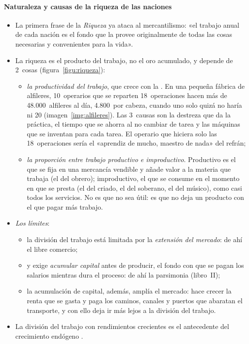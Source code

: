 \documentclass[11pt]{article}
\begin{document}
\paragraph{Naturaleza y causas de la riqueza de las naciones}\label{sec:smith-riqueza}
\begin{itemize}
\item La primera frase de la \emph{Riqueza} ya ataca al mercantilismo: «el trabajo anual de cada nación es el fondo que la provee originalmente de todas las cosas necesarias y convenientes para la vida»\nocite{Smith1776Wealth}.
\item La riqueza es el producto del trabajo, no el oro acumulado, y depende de 2~cosas (figura~\ref{figu:riqueza}):
  \begin{itemize}
  \item \emph{la productividad del trabajo}, que crece con la . En una pequeña fábrica de alfileres, 10~operarios que se reparten 18~operaciones hacen más de 48.000~alfileres al día, 4.800~por cabeza, cuando uno solo quizá no haría ni 20\nocite{Smith1776Wealth} (imagen~\ref{img:alfileres}). Las 3~causas son la destreza que da la práctica, el tiempo que se ahorra al no cambiar de tarea y las máquinas que se inventan para cada tarea. El operario que hiciera solo las 18~operaciones sería el «aprendiz de mucho, maestro de nada» del refrán;
  \item \emph{la proporción entre trabajo productivo e improductivo}. Productivo es el que se fija en una mercancía vendible y añade valor a la materia que trabaja (el del obrero); improductivo, el que se consume en el momento en que se presta (el del criado, el del soberano, el del músico), como casi todos los servicios. No es que no sea útil: es que no deja un producto con el que pagar más trabajo\nocite{Smith1776Wealth}.
  \end{itemize}
\item \emph{Los límites}:
  \begin{itemize}
  \item la división del trabajo está limitada por la \emph{extensión del mercado}\nocite{Smith1776Wealth}: de ahí el libre comercio;
  \item y exige \emph{acumular capital} antes de producir, el fondo con que se pagan los salarios mientras dura el proceso: de ahí la parsimonia (libro~II);
  \item la acumulación de capital, además, amplía el mercado: hace crecer la renta que se gasta y paga los caminos, canales y puertos que abaratan el transporte, y con ello deja ir más lejos a la división del trabajo.
  \end{itemize}
\item La división del trabajo con rendimientos crecientes es el antecedente del crecimiento endógeno\nocite{Young1928Increasing} .
\end{itemize}
\end{document}
